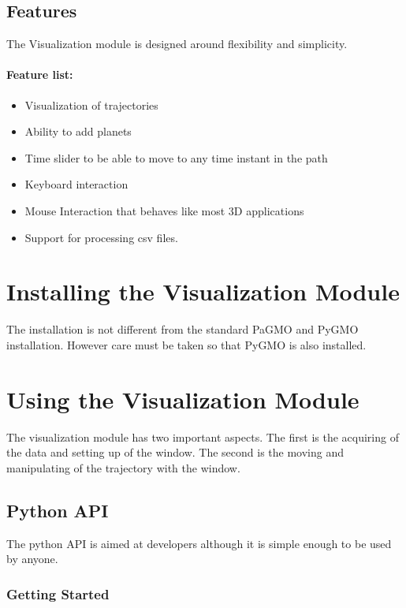 \documentclass[a4paper,11pt]{article}
\begin{document}
\subsection{Features}

The Visualization module is designed around flexibility and simplicity. 

\paragraph{Feature list:}
\begin{itemize}
\item Visualization of trajectories
\item Ability to add planets
\item Time slider to be able to move to any time instant in the path
\item Keyboard interaction
\item Mouse Interaction that behaves like most 3D applications
\item Support for processing \gls{csv} files.
\end{itemize}


\section{Installing the Visualization Module}\label{sec:install}

The installation is not different from the standard \gls{PaGMO} and \gls{PyGMO} installation\cite{install:pagmo}. However care must be taken so that \gls{PyGMO} is also installed.


\section{Using the Visualization Module}

The visualization module has two important aspects. The first is the acquiring of the data and setting up of the window. The second is the moving and manipulating of the trajectory with the window.


\subsection{Python API}

The \gls{python} \gls{API} is aimed at developers although it is simple enough to be used by anyone.

\subsubsection{Getting Started}\label{sec:started}
\end{document}
